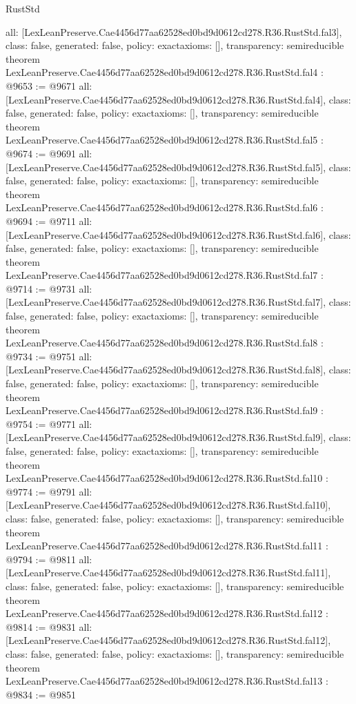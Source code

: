 \begin{lexlean}{RustStd}
\begin{coremodule}
{  all: [LexLeanPreserve.Cae4456d77aa62528ed0bd9d0612cd278.R36.RustStd.fal3],
  class: false,
  generated: false,
  policy: exact{axioms: []},
  transparency: semireducible
}
theorem LexLeanPreserve.Cae4456d77aa62528ed0bd9d0612cd278.R36.RustStd.fal4 : @9653 := @9671 {
  all: [LexLeanPreserve.Cae4456d77aa62528ed0bd9d0612cd278.R36.RustStd.fal4],
  class: false,
  generated: false,
  policy: exact{axioms: []},
  transparency: semireducible
}
theorem LexLeanPreserve.Cae4456d77aa62528ed0bd9d0612cd278.R36.RustStd.fal5 : @9674 := @9691 {
  all: [LexLeanPreserve.Cae4456d77aa62528ed0bd9d0612cd278.R36.RustStd.fal5],
  class: false,
  generated: false,
  policy: exact{axioms: []},
  transparency: semireducible
}
theorem LexLeanPreserve.Cae4456d77aa62528ed0bd9d0612cd278.R36.RustStd.fal6 : @9694 := @9711 {
  all: [LexLeanPreserve.Cae4456d77aa62528ed0bd9d0612cd278.R36.RustStd.fal6],
  class: false,
  generated: false,
  policy: exact{axioms: []},
  transparency: semireducible
}
theorem LexLeanPreserve.Cae4456d77aa62528ed0bd9d0612cd278.R36.RustStd.fal7 : @9714 := @9731 {
  all: [LexLeanPreserve.Cae4456d77aa62528ed0bd9d0612cd278.R36.RustStd.fal7],
  class: false,
  generated: false,
  policy: exact{axioms: []},
  transparency: semireducible
}
theorem LexLeanPreserve.Cae4456d77aa62528ed0bd9d0612cd278.R36.RustStd.fal8 : @9734 := @9751 {
  all: [LexLeanPreserve.Cae4456d77aa62528ed0bd9d0612cd278.R36.RustStd.fal8],
  class: false,
  generated: false,
  policy: exact{axioms: []},
  transparency: semireducible
}
theorem LexLeanPreserve.Cae4456d77aa62528ed0bd9d0612cd278.R36.RustStd.fal9 : @9754 := @9771 {
  all: [LexLeanPreserve.Cae4456d77aa62528ed0bd9d0612cd278.R36.RustStd.fal9],
  class: false,
  generated: false,
  policy: exact{axioms: []},
  transparency: semireducible
}
theorem LexLeanPreserve.Cae4456d77aa62528ed0bd9d0612cd278.R36.RustStd.fal10 : @9774 := @9791 {
  all: [LexLeanPreserve.Cae4456d77aa62528ed0bd9d0612cd278.R36.RustStd.fal10],
  class: false,
  generated: false,
  policy: exact{axioms: []},
  transparency: semireducible
}
theorem LexLeanPreserve.Cae4456d77aa62528ed0bd9d0612cd278.R36.RustStd.fal11 : @9794 := @9811 {
  all: [LexLeanPreserve.Cae4456d77aa62528ed0bd9d0612cd278.R36.RustStd.fal11],
  class: false,
  generated: false,
  policy: exact{axioms: []},
  transparency: semireducible
}
theorem LexLeanPreserve.Cae4456d77aa62528ed0bd9d0612cd278.R36.RustStd.fal12 : @9814 := @9831 {
  all: [LexLeanPreserve.Cae4456d77aa62528ed0bd9d0612cd278.R36.RustStd.fal12],
  class: false,
  generated: false,
  policy: exact{axioms: []},
  transparency: semireducible
}
theorem LexLeanPreserve.Cae4456d77aa62528ed0bd9d0612cd278.R36.RustStd.fal13 : @9834 := @9851 {
}
\end{coremodule}
\end{lexlean}
